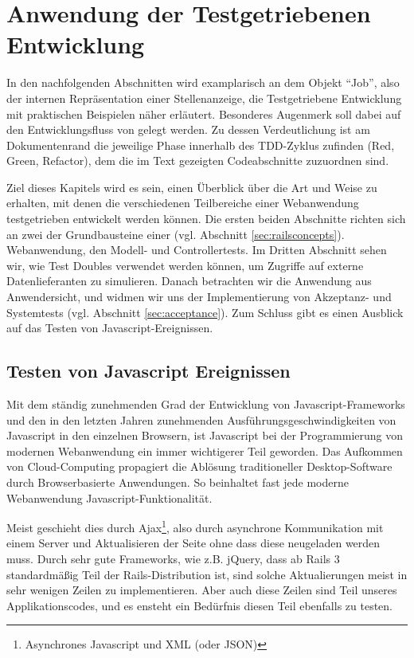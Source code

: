 \chapter{Anwendung der Testgetriebenen Entwicklung}
\label{sec:awtdd}

In den nachfolgenden Abschnitten wird examplarisch an dem Objekt "`Job"', also der internen Repräsentation einer Stellenanzeige, die Testgetriebene Entwicklung mit praktischen Beispielen näher erläutert.
Besonderes Augenmerk soll dabei auf den Entwicklungsfluss von  gelegt werden. Zu dessen Verdeutlichung ist am Dokumentenrand die jeweilige Phase innerhalb des TDD-Zyklus zufinden (Red, Green, Refactor), dem die im Text gezeigten Codeabschnitte zuzuordnen sind.

Ziel dieses Kapitels wird es sein, einen Überblick über die Art und Weise zu erhalten, mit denen die verschiedenen Teilbereiche einer Webanwendung testgetrieben entwickelt werden können.
Die ersten beiden Abschnitte richten sich an zwei der Grundbausteine einer  (vgl. Abschnitt \ref{sec:railsconcepts}).
Webanwendung, den Modell- und Controllertests. Im Dritten Abschnitt sehen wir, wie Test Doubles verwendet werden können, um Zugriffe auf externe Datenlieferanten zu simulieren. Danach betrachten wir die Anwendung aus Anwendersicht, und widmen wir uns der Implementierung von Akzeptanz- und Systemtests (vgl. Abschnitt \ref{sec:acceptance}). 
Zum Schluss gibt es einen Ausblick auf das Testen von Javascript-Ereignissen.






\section{Testen von Javascript Ereignissen}

Mit dem ständig zunehmenden Grad der Entwicklung von Javascript-Frameworks und den in den letzten Jahren zunehmenden Ausführungsgeschwindigkeiten von Javascript in den einzelnen Browsern, ist Javascript bei der Programmierung von modernen Webanwendung ein immer wichtigerer Teil geworden. Das Aufkommen von Cloud-Computing propagiert die Ablösung traditioneller Desktop-Software durch Browserbasierte Anwendungen. So beinhaltet fast jede moderne Webanwendung Javascript-Funktionalität.

Meist geschieht dies durch Ajax\footnote{Asynchrones Javascript und XML (oder JSON)}, also durch asynchrone Kommunikation mit einem Server und Aktualisieren der Seite ohne dass diese neugeladen werden muss. Durch sehr gute Frameworks, wie z.B. jQuery, dass ab Rails 3 standardmäßig Teil der Rails-Distribution ist, sind solche Aktualierungen meist in sehr wenigen Zeilen zu implementieren. Aber auch diese Zeilen sind Teil unseres Applikationscodes, und es ensteht ein Bedürfnis diesen Teil ebenfalls zu testen.

